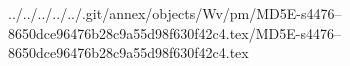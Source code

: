../../../../../.git/annex/objects/Wv/pm/MD5E-s4476--8650dce96476b28c9a55d98f630f42c4.tex/MD5E-s4476--8650dce96476b28c9a55d98f630f42c4.tex